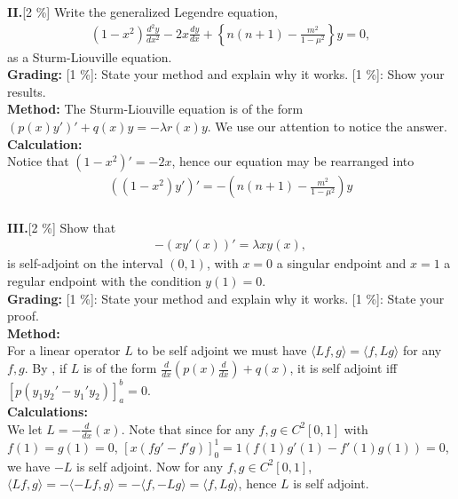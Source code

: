 \documentclass[A4paper,12pt]{article}
\theoremstyle{definition}
\numberwithin{equation}{section}
\begin{document}
\vspace{20pt}
\textbf{II.}[2 \%] Write the generalized Legendre equation,
\begin{align*}
(1-x^2)\frac{d^2y}{dx^2}-2x\frac{dy}{dx}+\left\{n(n+1)-\frac{m^2}{1-\mu^2}\right\}y=0,
\end{align*}
as a Sturm-Liouville equation.\\
\textbf{Grading:}
[1 \%]: State your method and explain why it works.
[1 \%]: Show your results.
\vspace{20pt}
\\
\textbf{Method: }
The Sturm-Liouville equation is of the form $(p(x)y')' + q(x)y = -\lambda r(x)y$. We use our attention to notice the answer.\\
\textbf{Calculation:}\\
Notice that $(1-x^2)' = -2x$, hence our equation may be rearranged into \begin{align*}
    ((1-x^2) y')' = -(n(n+1) - \frac{m^2}{1-\mu^2})y
\end{align*}
\\
\textbf{III.}[2 \%] Show that
\begin{align*}
-(xy'(x))'=\lambda xy(x),
\end{align*}
is self-adjoint on the interval \((0,1)\), with \(x=0\) a singular
endpoint and \(x=1\) a regular endpoint with the condition \(y(1)=0\).\\
\textbf{Grading:}
[1 \%]: State your method and explain why it works.
[1 \%]: State your proof.
\\
\textbf{Method: }\\
For a linear operator $L$ to be self adjoint we must have $\langle Lf,g \rangle = \langle f,Lg \rangle$ for any $f, g$.
By \cite{textbook}, if $L$ is of the form $\frac{d}{dx}(p(x)\frac{d}{dx}) + q(x)$, it is self adjoint iff $[p(y_1y_2'-y_1'y_2)]_a^b = 0$.
\\
\textbf{Calculations:}\\
We let $L = -\frac{d}{dx}(x)$. Note that since for any $f, g \in C^2[0, 1]$ with $f(1) = g(1) = 0$, $[x(fg'-f'g)]_0^1 = 1(f(1)g'(1) - f'(1)g(1)) = 0$, we have $-L$ is self adjoint.
Now for any $f, g \in C^2[0,1]$, $\langle Lf, g\rangle = -\langle -Lf, g \rangle = -\langle f, -Lg \rangle = \langle f, Lg \rangle$, hence $L$ is self adjoint.


\

\end{document}
